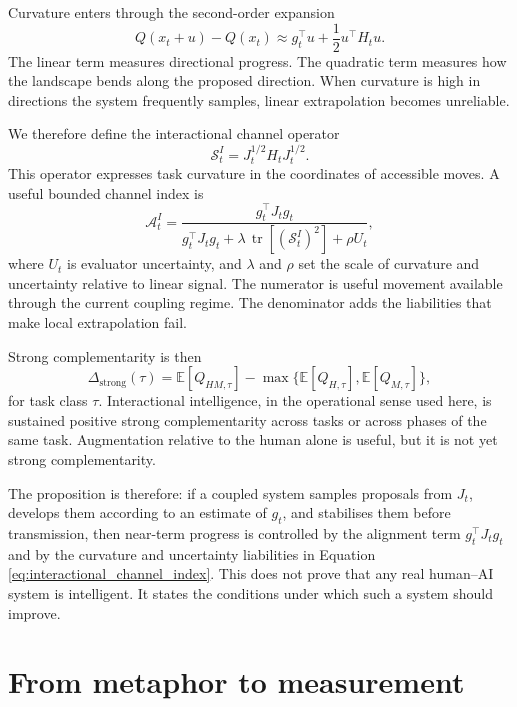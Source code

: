 \documentclass[11pt]{article}
\newcommand{\E}{\mathbb{E}}
\newcommand{\tr}{\operatorname{tr}}
\newcommand{\Aint}{\mathcal{A}^{I}}
\newcommand{\Schan}{\mathcal{S}^{I}}
\newcommand{\DeltaStrong}{\Delta_{\mathrm{strong}}}
\begin{document}
Curvature enters through the second-order expansion
\begin{equation}
    Q(x_t+u)-Q(x_t) \approx g_t^\top u + \frac{1}{2}u^\top H_tu.
\end{equation}
The linear term measures directional progress. The quadratic term measures how the landscape bends along the proposed direction. When curvature is high in directions the system frequently samples, linear extrapolation becomes unreliable.

We therefore define the interactional channel operator
\begin{equation}
    \Schan_t = J_t^{1/2} H_t J_t^{1/2}. \label{eq:channel_operator}
\end{equation}
This operator expresses task curvature in the coordinates of accessible moves. A useful bounded channel index is
\begin{equation}
    \Aint_t =
    \frac{g_t^\top J_t g_t}
    {g_t^\top J_t g_t + \lambda\,\tr[(\Schan_t)^2] + \rho U_t},
    \label{eq:interactional_channel_index}
\end{equation}
where $U_t$ is evaluator uncertainty, and $\lambda$ and $\rho$ set the scale of curvature and uncertainty relative to linear signal. The numerator is useful movement available through the current coupling regime. The denominator adds the liabilities that make local extrapolation fail.

Strong complementarity is then
\begin{equation}
    \DeltaStrong(\tau)=
    \E[Q_{HM,\tau}]-\max\{\E[Q_{H,\tau}],\E[Q_{M,\tau}]\},
    \label{eq:strong_complementarity}
\end{equation}
for task class $\tau$. Interactional intelligence, in the operational sense used here, is sustained positive strong complementarity across tasks or across phases of the same task. Augmentation relative to the human alone is useful, but it is not yet strong complementarity.

The proposition is therefore: if a coupled system samples proposals from $J_t$, develops them according to an estimate of $g_t$, and stabilises them before transmission, then near-term progress is controlled by the alignment term $g_t^\top J_tg_t$ and by the curvature and uncertainty liabilities in Equation \ref{eq:interactional_channel_index}. This does not prove that any real human--AI system is intelligent. It states the conditions under which such a system should improve.

\section*{From metaphor to measurement}
\end{document}
